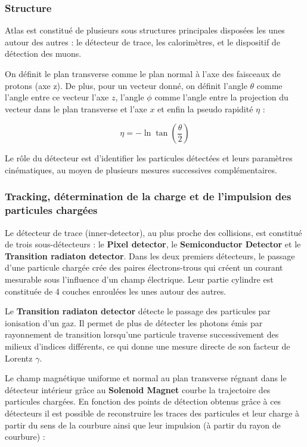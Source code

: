 \documentclass[11pt]{article} %
\begin{document}
\subsubsection{Structure}

Atlas est constitué de plusieurs sous structures principales disposées les unes autour des autres : le détecteur de trace, les calorimètres, et le dispositif de détection des muons.

On définit le plan transverse comme le plan normal à l'axe des faisceaux de protons (axe z).
De plus, pour un vecteur donné, on définit l'angle $\theta$ comme l'angle entre ce vecteur l'axe $z$,  l'angle $\phi$ comme l'angle entre la projection du vecteur dans le plan transverse et l'axe $x$ et enfin la pseudo rapidité $\eta$ :

\begin{equation}
\eta = -\ln \tan \left (\dfrac{\theta}{2} \right)
\end{equation}

Le rôle du détecteur est d'identifier les particules détectées et  leurs paramètres cinématiques, au moyen de plusieurs mesures successives complémentaires.

\subsubsection{Tracking, détermination de la charge et de l'impulsion des particules chargées}

Le détecteur de trace (inner-detector), au plus proche des collisions, est constitué de trois sous-détecteurs : le \textbf{Pixel detector}, le \textbf{Semiconductor Detector} et le \textbf{Transition radiaton detector}. Dans les deux premiers détecteurs, le passage d'une particule chargée crée des paires électrons-trous qui créent un courant mesurable sous l'influence d'un champ électrique. Leur partie cylindre est constituée de 4 couches enroulées les unes autour des autres.

Le \textbf{Transition radiaton detector} détecte le passage des particules par ionisation d'un gaz. Il permet de plus de détecter les photons émis par rayonnement de transition lorsqu'une particule traverse successivement des milieux d'indices différents, ce qui donne une mesure directe de son facteur de Lorentz $\gamma$.

Le champ magnétique uniforme et normal au plan transverse régnant dans le détecteur  intérieur  grâce au \textbf{Solenoid Magnet} courbe la trajectoire des particules chargées. En fonction des points de détection obtenus grâce à ces détecteurs il est possible de reconstruire les traces des particules et leur charge à partir du sens de la courbure ainsi que leur impulsion (à partir du rayon de courbure) :
\end{document}
